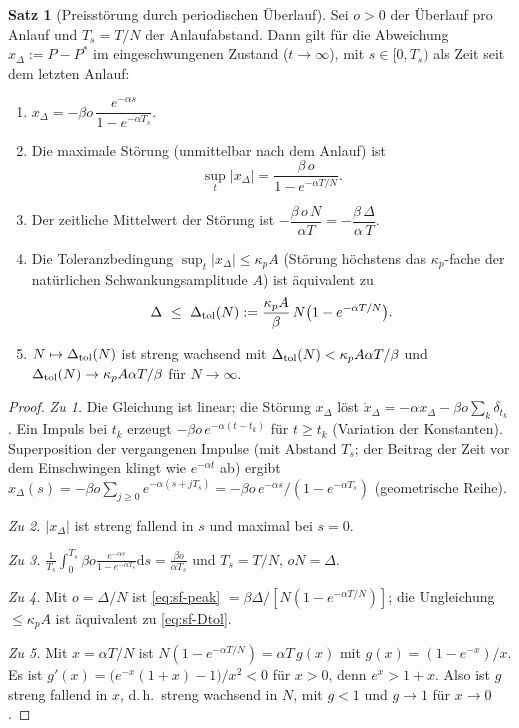 \documentclass[a4paper, 12pt, twoside, openright]{report}
\theoremstyle{definition}
\theoremstyle{definition}
\newtheorem{satz}{Satz}[chapter]
\begin{document}
\begin{satz}[Preisstörung durch periodischen Überlauf]\label{satz:sf-preis}
Sei $o>0$ der Überlauf pro Anlauf und $T_s=T/N$ der Anlaufabstand. Dann gilt für die
Abweichung $x_\Delta:=P-P^*$ im eingeschwungenen Zustand ($t\to\infty$), mit
$s\in[0,T_s)$ als Zeit seit dem letzten Anlauf:
\begin{enumerate}
  \item $x_\Delta=-\beta o\,\dfrac{e^{-\alpha s}}{1-e^{-\alpha T_s}}$.
  \item Die maximale Störung (unmittelbar nach dem Anlauf) ist
    \begin{equation}
      \sup_t|x_\Delta|=\frac{\beta\,o}{1-e^{-\alpha T/N}} .
      \label{eq:sf-peak}
    \end{equation}
  \item Der zeitliche Mittelwert der Störung ist $-\dfrac{\beta\,o\,N}{\alpha T}
    =-\dfrac{\beta\,\Delta}{\alpha\,T}$.
  \item Die Toleranzbedingung $\sup_t|x_\Delta|\le\kappa_pA$ (Störung höchstens das
    $\kappa_p$-fache der natürlichen Schwankungsamplitude $A$) ist äquivalent zu
    \begin{equation}
      \Delta\ \le\ \Delta_{\rm tol}(N):=\frac{\kappa_pA}{\beta}\,N\bigl(1-e^{-\alpha T/N}\bigr).
      \label{eq:sf-Dtol}
    \end{equation}
  \item $N\mapsto\Delta_{\rm tol}(N)$ ist streng wachsend mit
    $\Delta_{\rm tol}(N)<\kappa_pA\alpha T/\beta$ und
    $\Delta_{\rm tol}(N)\to\kappa_pA\alpha T/\beta$ für $N\to\infty$.
\end{enumerate}
\end{satz}

\begin{proof}
\emph{Zu 1.} Die Gleichung ist linear; die Störung $x_\Delta$ löst
$\dot x_\Delta=-\alpha x_\Delta-\beta o\sum_k\delta_{t_k}$. Ein Impuls bei $t_k$
erzeugt $-\beta o\,e^{-\alpha(t-t_k)}$ für $t\ge t_k$ (Variation der Konstanten).
Superposition der vergangenen Impulse (mit Abstand $T_s$; der Beitrag der Zeit vor
dem Einschwingen klingt wie $e^{-\alpha t}$ ab) ergibt
$x_\Delta(s)=-\beta o\sum_{j\ge0}e^{-\alpha(s+jT_s)}=-\beta o\,e^{-\alpha s}/(1-e^{-\alpha T_s})$
(geometrische Reihe).

\emph{Zu 2.} $|x_\Delta|$ ist streng fallend in $s$ und maximal bei $s=0$.

\emph{Zu 3.} $\frac1{T_s}\int_0^{T_s}\beta o\frac{e^{-\alpha s}}{1-e^{-\alpha T_s}}\mathrm{d}s
=\frac{\beta o}{\alpha T_s}$ und $T_s=T/N$, $oN=\Delta$.

\emph{Zu 4.} Mit $o=\Delta/N$ ist \eqref{eq:sf-peak} $=\beta\Delta/[N(1-e^{-\alpha T/N})]$;
die Ungleichung $\le\kappa_pA$ ist äquivalent zu \eqref{eq:sf-Dtol}.

\emph{Zu 5.} Mit $x=\alpha T/N$ ist $N(1-e^{-\alpha T/N})=\alpha T\,g(x)$ mit
$g(x)=(1-e^{-x})/x$. Es ist $g'(x)=\bigl(e^{-x}(1+x)-1\bigr)/x^2<0$ für $x>0$, denn
$e^{x}>1+x$. Also ist $g$ streng fallend in $x$, d.\,h.\ streng wachsend in $N$,
mit $g<1$ und $g\to1$ für $x\to0$.
\end{proof}
\end{document}
